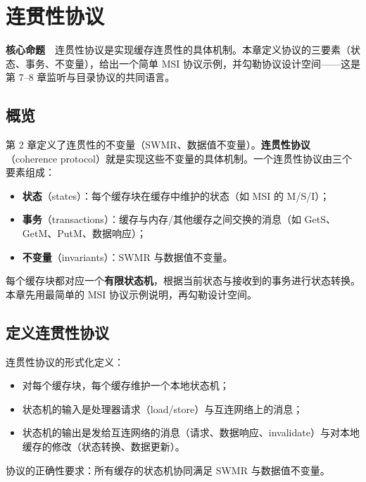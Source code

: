 \chapter{连贯性协议}

\begin{epigraph}
\textbf{核心命题}　连贯性协议是实现缓存连贯性的具体机制。本章定义协议的三要素（状态、事务、不变量），给出一个简单 MSI 协议示例，并勾勒协议设计空间——这是第 7–8 章监听与目录协议的共同语言。
\end{epigraph}



\section{概览}

第 2 章定义了连贯性的不变量（SWMR、数据值不变量）。\textbf{连贯性协议}（coherence protocol）就是实现这些不变量的具体机制。一个连贯性协议由三个要素组成：

\begin{itemize}
\item \textbf{状态}（states）：每个缓存块在缓存中维护的状态（如 MSI 的 M/S/I）；
\item \textbf{事务}（transactions）：缓存与内存/其他缓存之间交换的消息（如 GetS、GetM、PutM、数据响应）；
\item \textbf{不变量}（invariants）：SWMR 与数据值不变量。
\end{itemize}


每个缓存块都对应一个\textbf{有限状态机}，根据当前状态与接收到的事务进行状态转换。本章先用最简单的 MSI 协议示例说明，再勾勒设计空间。

\section{定义连贯性协议}

连贯性协议的形式化定义：

\begin{itemize}
\item 对每个缓存块，每个缓存维护一个本地状态机；
\item 状态机的输入是处理器请求（load/store）与互连网络上的消息；
\item 状态机的输出是发给互连网络的消息（请求、数据响应、invalidate）与对本地缓存的修改（状态转换、数据更新）。
\end{itemize}


协议的正确性要求：所有缓存的状态机协同满足 SWMR 与数据值不变量。


